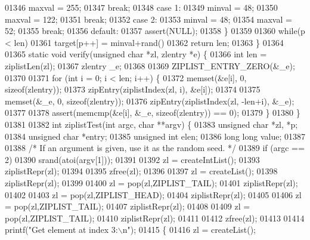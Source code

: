 \begin{DoxyCode}
{{{{{{{{{{{{{{{{{01346         maxval = 255;
01347     \textcolor{keywordflow}{break};
01348     \textcolor{keywordflow}{case} 1:
01349         minval = 48;
01350         maxval = 122;
01351     \textcolor{keywordflow}{break};
01352     \textcolor{keywordflow}{case} 2:
01353         minval = 48;
01354         maxval = 52;
01355     \textcolor{keywordflow}{break};
01356     \textcolor{keywordflow}{default}:
01357         assert(NULL);
01358     \}
01359 
01360     \textcolor{keywordflow}{while}(p < len)
01361         target[p++] = minval+rand()%
01362     \textcolor{keywordflow}{return} len;
01363 \}
01364 
01365 \textcolor{keyword}{static} \textcolor{keywordtype}{void} verify(\textcolor{keywordtype}{unsigned} \textcolor{keywordtype}{char} *zl, zlentry *e) \{
01366     \textcolor{keywordtype}{int} len = ziplistLen(zl);
01367     zlentry \_e;
01368 
01369     ZIPLIST\_ENTRY\_ZERO(&\_e);
01370 
01371     \textcolor{keywordflow}{for} (\textcolor{keywordtype}{int} i = 0; i < len; i++) \{
01372         memset(&e[i], 0, \textcolor{keyword}{sizeof}(zlentry));
01373         zipEntry(ziplistIndex(zl, i), &e[i]);
01374 
01375         memset(&\_e, 0, \textcolor{keyword}{sizeof}(zlentry));
01376         zipEntry(ziplistIndex(zl, -len+i), &\_e);
01377 
01378         assert(memcmp(&e[i], &\_e, \textcolor{keyword}{sizeof}(zlentry)) == 0);
01379     \}
01380 \}
01381 
01382 \textcolor{keywordtype}{int} ziplistTest(\textcolor{keywordtype}{int} argc, \textcolor{keywordtype}{char} **argv) \{
01383     \textcolor{keywordtype}{unsigned} \textcolor{keywordtype}{char} *zl, *p;
01384     \textcolor{keywordtype}{unsigned} \textcolor{keywordtype}{char} *entry;
01385     \textcolor{keywordtype}{unsigned} \textcolor{keywordtype}{int} elen;
01386     \textcolor{keywordtype}{long} \textcolor{keywordtype}{long} value;
01387 
01388     \textcolor{comment}{/* If an argument is given, use it as the random seed. */}
01389     \textcolor{keywordflow}{if} (argc == 2)
01390         srand(atoi(argv[1]));
01391 
01392     zl = createIntList();
01393     ziplistRepr(zl);
01394 
01395     zfree(zl);
01396 
01397     zl = createList();
01398     ziplistRepr(zl);
01399 
01400     zl = pop(zl,ZIPLIST\_TAIL);
01401     ziplistRepr(zl);
01402 
01403     zl = pop(zl,ZIPLIST\_HEAD);
01404     ziplistRepr(zl);
01405 
01406     zl = pop(zl,ZIPLIST\_TAIL);
01407     ziplistRepr(zl);
01408 
01409     zl = pop(zl,ZIPLIST\_TAIL);
01410     ziplistRepr(zl);
01411 
01412     zfree(zl);
01413 
01414     printf(\textcolor{stringliteral}{"Get element at index 3:\(\backslash\)n"});
01415     \{
01416         zl = createList();
}}}}}}}}}}}}}}}}}
\end{DoxyCode}

